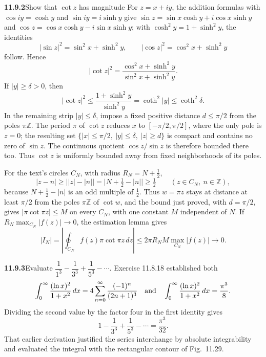 \par\bigskip
\noindent\textbf{11.9.2}\quad Show that $\cot z$ has magnitude
\solution
For $z=x+iy$, the addition formulas with $\cos iy=\cosh y$ and
$\sin iy=i\sinh y$ give
$\sin z=\sin x\cosh y+i\cos x\sinh y$ and
$\cos z=\cos x\cosh y-i\sin x\sinh y$; with $\cosh^2y=1+\sinh^2y$,
the identities
\[
|\sin z|^2=\sin^2x+\sinh^2y,\qquad
|\cos z|^2=\cos^2x+\sinh^2y
\]
follow. Hence
\[
|\cot z|^2=
\frac{\cos^2x+\sinh^2y}{\sin^2x+\sinh^2y}.
\]
If $|y|\ge\delta>0$, then
\[
|\cot z|^2\le
\frac{1+\sinh^2y}{\sinh^2y}=\coth^2|y|
\le\coth^2\delta.
\]
In the remaining strip $|y|\le\delta$, impose a fixed positive
distance $d\le\pi/2$ from the poles $\pi\mathbb Z$. The period $\pi$
of $\cot z$ reduces $x$ to $[-\pi/2,\pi/2]$, where the only pole is
$z=0$; the resulting set
$\{|x|\le\pi/2,\ |y|\le\delta,\ |z|\ge d\}$ is compact and
contains no zero of $\sin z$. The continuous quotient
$\cos z/\sin z$ is therefore bounded there too. Thus $\cot z$ is
uniformly bounded away from fixed neighborhoods of its poles.

For the text's circles $C_N$, with radius $R_N=N+\tfrac12$,
\[
|z-n|\ge\bigl||z|-|n|\bigr|=\bigl|N+\tfrac12-|n|\bigr|\ge\tfrac12
\qquad(z\in C_N,\ n\in\mathbb Z),
\]
because $N+\frac12-|n|$ is an odd multiple of $\frac12$. Thus
$w=\pi z$ stays at distance at least $\pi/2$ from the poles
$\pi\mathbb Z$ of $\cot w$, and the bound just proved, with $d=\pi/2$,
gives $|\pi\cot\pi z|\le M$ on every $C_N$, with one
constant $M$ independent of $N$. If
$R_N\max_{C_N}|f(z)|\to0$, the estimation lemma gives
\[
|I_N|=\left|\oint_{C_N}f(z)\pi\cot\pi z\,dz\right|
\le2\pi R_NM\max_{C_N}|f(z)|\longrightarrow0.
\]

\par\bigskip
\noindent\textbf{11.9.3}\quad Evaluate
$\dfrac{1}{1^{3}}-\dfrac{1}{3^{3}}+\dfrac{1}{5^{3}}-\cdots$.
\solution
Exercise 11.8.18 established both
\[
\int_0^\infty\frac{(\ln x)^2}{1+x^2}\,dx
=4\sum_{n=0}^{\infty}\frac{(-1)^n}{(2n+1)^3}
\quad\hbox{and}\quad
\int_0^\infty\frac{(\ln x)^2}{1+x^2}\,dx=\frac{\pi^3}{8}.
\]
Dividing the second value by the factor four in the first identity gives
\[
\boxed{1-\frac1{3^3}+\frac1{5^3}-\cdots=\frac{\pi^3}{32}}.
\]
That earlier derivation justified the series interchange by absolute
integrability and evaluated the integral with the rectangular contour
of Fig.~11.29.

